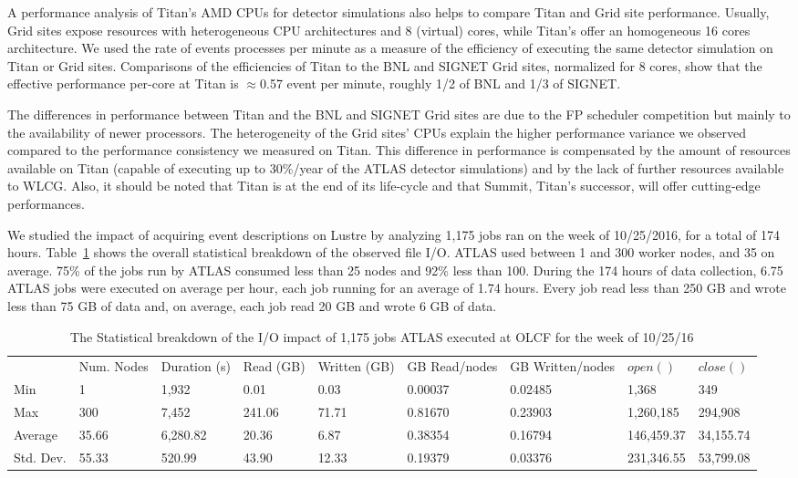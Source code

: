A performance analysis of Titan's AMD CPUs for detector simulations also
helps to compare Titan and Grid site performance. Usually, Grid sites expose
resources with heterogeneous CPU architectures and 8 (virtual) cores, while
Titan's offer an homogeneous 16 cores architecture. We used the rate of
events processes per minute as a measure of the efficiency of executing the
same detector simulation on Titan or Grid sites. Comparisons of the
efficiencies of Titan to the BNL and SIGNET Grid sites, normalized for 8
cores, show that the effective performance per-core at Titan is
\(\approx\)0.57 event per minute, roughly 1/2 of BNL and  1/3 of SIGNET\@.

The differences in performance between Titan and the BNL and SIGNET Grid
sites are due to the FP scheduler competition but mainly to the availability
of newer processors. The heterogeneity of the Grid sites' CPUs explain the
higher performance variance we observed compared to the performance
consistency we measured on Titan. This difference in performance is
compensated by the amount of resources available on Titan (capable of
executing up to 30\%/year of the ATLAS detector simulations) and by the lack
of further resources available to WLCG\@. Also, it should be noted that Titan
is at the end of its life-cycle and that Summit, Titan's successor, will
offer cutting-edge performances.

We studied the impact of acquiring event descriptions on Lustre by analyzing
1,175 jobs ran on the week of 10/25/2016, for a total of 174 hours.
Table~\ref{panda-olcf-stats} shows the overall statistical breakdown of the
observed file I/O. ATLAS used between 1 and 300 worker nodes, and 35 on
average. 75\% of the jobs run by ATLAS consumed less than 25 nodes and 92\%
less than 100. During the 174 hours of data collection, 6.75 ATLAS jobs were
executed on average per hour, each job running for an average of 1.74 hours.
Every job read less than 250 GB and wrote less than 75 GB of data and, on
average, each job read 20 GB and wrote 6 GB of data.

\begin{table}[t]
\centering
\begin{tabular}{lllllllll} & Num. Nodes & Duration (s) & Read (GB) & Written
 (GB) & GB Read/nodes & GB Written/nodes & \(open()\) & \(close()\) \\ Min &
 1 & 1,932 & 0.01 & 0.03 & 0.00037 & 0.02485 & 1,368 & 349 \\ Max & 300 &
 7,452 & 241.06 & 71.71 & 0.81670 & 0.23903 & 1,260,185 & 294,908 \\ Average
 & 35.66 & 6,280.82 & 20.36 & 6.87 & 0.38354 & 0.16794 & 146,459.37 &
 34,155.74 \\ Std. Dev. & 55.33 & 520.99 & 43.90 & 12.33 & 0.19379 & 0.03376
 & 231,346.55 & 53,799.08
\end{tabular}
\caption{The Statistical breakdown of the I/O impact of 1,175 jobs ATLAS
executed at OLCF for the week of 10/25/16}\label{panda-olcf-stats}
\end{table}

